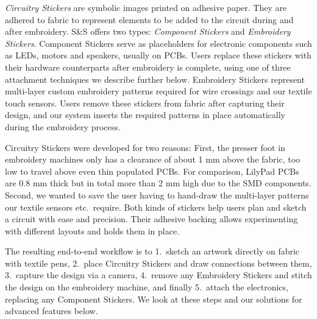 \documentclass[header.tex]{subfiles}
\begin{document}
\textit{Circuitry Stickers} are symbolic images printed on adhesive paper. 
They are adhered to fabric to represent elements to be added to the circuit during and after embroidery. S\&S offers two types: \textit{Component Stickers} and \textit{Embroidery Stickers}. Component Stickers serve as placeholders for electronic components such as LEDs, motors and speakers, usually on PCBs. Users replace these stickers with their hardware counterparts after embroidery is complete, using one of three attachment techniques we describe further below. Embroidery Stickers represent multi-layer custom embroidery patterns required for wire crossings and our textile touch sensors. Users remove these stickers from fabric after capturing their design, and our system inserts the required patterns in place automatically during the embroidery process.

Circuitry Stickers were developed for two reasons: First, the presser foot in embroidery machines only has a clearance of about 1 mm above the fabric, too low to travel above even thin populated PCBs. For comparison, LilyPad PCBs are 0.8 mm thick but in total more than 2 mm high due to the SMD components. 
Second, we wanted to save the user having to hand-draw the multi-layer patterns our textile sensors etc.\ require. Both kinds of stickers help users plan and sketch a circuit with ease and precision. Their adhesive backing allows experimenting with different layouts and holds them in place. %


The resulting end-to-end workflow is to 1.\ sketch an artwork directly on fabric with textile pens, 2.\ place Circuitry Stickers and draw connections between them, 3.\ capture the design via a camera, 4.\ remove any Embroidery Stickers and stitch the design on the embroidery machine, and finally 5.\ attach the electronics, replacing any Component Stickers. We look at these steps and our solutions for advanced features below.

\end{document}
